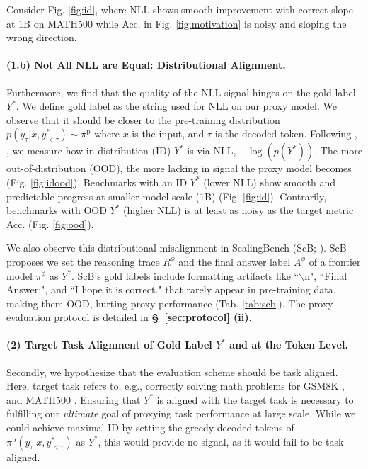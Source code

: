 \vspace*{-1mm}Consider Fig. \ref{fig:id}, where NLL shows smooth improvement with correct slope at 1B on MATH500 while Acc. in Fig. \ref{fig:motivation} is noisy and sloping the wrong direction.

\paragraph{(1.b) Not All NLL are Equal: Distributional Alignment.} Furthermore, we find that the quality of the NLL signal hinges on the gold label $Y^*$. We define gold label as the string used for NLL on our proxy model. We observe that it should be closer to the pre-training distribution $p(y_\tau \vert x, y^*_{<\tau}) \sim \pi^\text{p}$ where $x$ is the input, and $\tau$ is the decoded token. Following \cite{arora-etal-2021-types}, \cite{gonen2023demystifying}, we measure how in-distribution (ID) $Y^*$ is via NLL, $-\log(p(Y^*))$. The more out-of-distribution (OOD), the more lacking in signal the proxy model becomes (Fig. \ref{fig:idood}). Benchmarks with an ID $Y^*$ (lower NLL) show smooth and predictable progress at smaller model scale (1B) (Fig. \ref{fig:id}). Contrarily, benchmarks with OOD $Y^*$ (higher NLL) is at least as noisy as the target metric Acc. (Fig. \ref{fig:ood}). 

We also observe this distributional misalignment in ScalingBench (ScB; \cite{xiao2024densing,team2025minicpm4}). ScB proposes we set the reasoning trace $R^\phi$ \citep{NEURIPS2022_9d560961} and the final answer label $A^\phi$ of a frontier model $\pi^\phi$ as $Y^*$. ScB's gold labels include formatting artifacts like ``$\backslash$n", ``Final Answer:", and ``I hope it is correct." that rarely appear in pre-training data, making them OOD, hurting proxy performance (Tab. \ref{tab:scb}). The proxy evaluation protocol is detailed in \textbf{\S\ \ref{sec:protocol} (ii)}. 


\paragraph{(2) Target Task Alignment of Gold Label $Y^*$ and at the Token Level.} Secondly, we hypothesize that the evaluation scheme should be task aligned. Here, target task refers to, e.g., correctly solving math problems for GSM8K \citep{cobbe2021training}, and MATH500 \citep{hendrycks2021math}. Ensuring that $Y^*$ is aligned with the target task is necessary to fulfilling our \textit{ultimate} goal of proxying task performance at large scale. While we could achieve maximal ID by setting the greedy decoded tokens of $\pi^\text{p}(y_\tau \vert x, y^*_{<\tau})$ as $Y^*$, this would provide no signal, as it would fail to be task aligned. 

